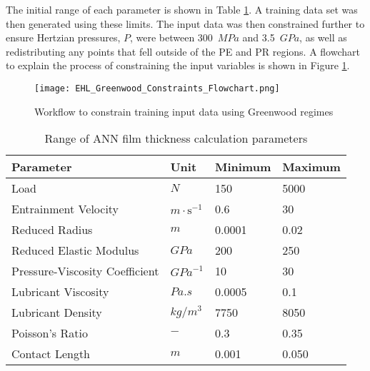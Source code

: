 The initial range of each parameter is shown in Table \ref{Range of ANN film thickness calculation parameters}. A training data set was then generated using these limits. The input data was then constrained further to ensure Hertzian pressures, $P$, were between 300~$MPa$ and 3.5~$GPa$, as well as redistributing any points that fell outside of the PE and PR regions. A flowchart to explain the process of constraining the input variables is shown in Figure \ref{EHL_Greenwood_Constraints_Flowchart}.

\begin{figure}
	\centering  
	\texttt{[image: EHL\_Greenwood\_Constraints\_Flowchart.png]}
	\caption{Workflow to constrain training input data using Greenwood regimes}
	\label{EHL_Greenwood_Constraints_Flowchart}
\end{figure} 



\begin{table*}
	\caption{Range of ANN film thickness calculation parameters}
	\label{Range of ANN film thickness calculation parameters}
	\centering
	\renewcommand{\arraystretch}{1.5}%
	\begin{tabular}{|P{0.4\textwidth}|P{0.15\textwidth}|P{0.15\textwidth}|P{0.15\textwidth}|}
		\hline
		\textbf{Parameter} & \textbf{Unit} & \textbf{Minimum} & \textbf{Maximum} \\ [0.5ex]
		\hline
		Load & $N$ & 150 & 5000 \\ [0.5ex]
		\hline
		Entrainment Velocity & $m \cdot \mathrm{s}^{-1}$ & 0.6 & 30 \\ [0.5ex]
		\hline
		Reduced Radius & $m$ & 0.0001 & 0.02 \\ [0.5ex]
		\hline
		Reduced Elastic Modulus & $GPa$ & 200 & 250 \\ [0.5ex]
		\hline
		Pressure-Viscosity Coefficient & ${GPa}^{-1}$ & 10 & 30 \\ [0.5ex]
		\hline
		Lubricant Viscosity & $Pa.s$ & 0.0005 & 0.1 \\ [0.5ex]
		\hline
		Lubricant Density & ${kg}/{m}^3$ & 7750 & 8050 \\ [0.5ex]
		\hline
		Poisson's Ratio & $-$ & 0.3 & 0.35 \\ [0.5ex]
		\hline
		Contact Length & $m$ & 0.001 & 0.050 \\ [0.5ex]
		\hline
		
	\end{tabular}
\end{table*}

